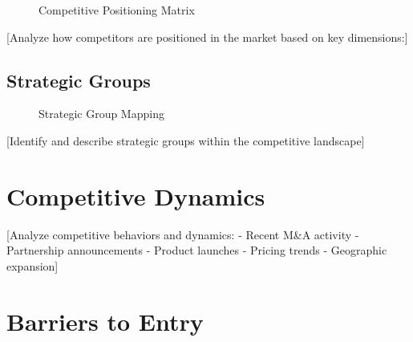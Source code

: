 \documentclass[11pt,letterpaper]{report}
\begin{document}

\begin{figure}[htbp]
\centering
\caption{Competitive Positioning Matrix}
\label{fig:competitive_positioning}
\end{figure}

[Analyze how competitors are positioned in the market based on key dimensions:]

\subsection{Strategic Groups}


\begin{figure}[htbp]
\centering
\caption{Strategic Group Mapping}
\label{fig:strategic_groups}
\end{figure}

[Identify and describe strategic groups within the competitive landscape]

\section{Competitive Dynamics}

[Analyze competitive behaviors and dynamics:
- Recent M\&A activity
- Partnership announcements
- Product launches
- Pricing trends
- Geographic expansion]

\section{Barriers to Entry}
\end{document}
